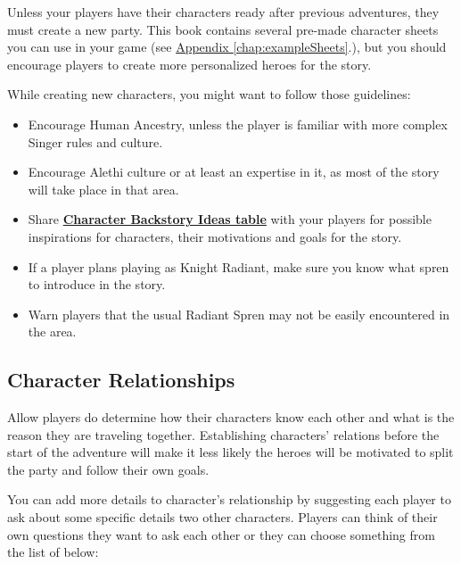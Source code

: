 Unless your players have their characters ready after previous adventures, they must create a new party. This book contains several pre-made character sheets you can use in your game (see \hyperref[chap:exampleSheets]{Appendix \ref{chap:exampleSheets}}.), but you should encourage players to create more personalized heroes for the story.

While creating new characters, you might want to follow those guidelines:
\begin{itemize}
	\item Encourage Human Ancestry, unless the player is familiar with more complex Singer rules and culture.
	\item Encourage Alethi culture or at least an expertise in it, as most of the story will take place in that area.
	\item Share \hyperref[backstoryIdeas]{\textbf{Character Backstory Ideas table}} with your players for possible inspirations for characters, their motivations and goals for the story.
	\item If a player plans playing as Knight Radiant, make sure you know what spren to introduce in the story.
	\item Warn players that the usual Radiant Spren may not be easily encountered in the area.
\end{itemize}

\subsection{Character Relationships}

Allow players do determine how their characters know each other and what is the reason they are traveling together. Establishing characters’ relations before the start of the adventure will make it less likely the heroes will be motivated to split the party and follow their own goals.

You can add more details to character’s relationship by suggesting each player to ask about some specific details two other characters. Players can think of their own questions they want to ask each other or they can choose something from the list of below:

